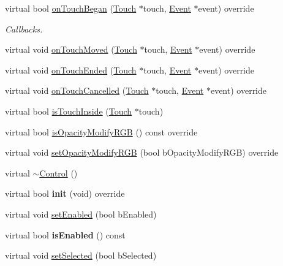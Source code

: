 \begin{DoxyCompactItemize}
\item 
virtual bool \hyperlink{classControl_a0cf2e20cea5b57b263e965be4a19ab52}{on\+Touch\+Began} (\hyperlink{classTouch}{Touch} $\ast$touch, \hyperlink{classEvent}{Event} $\ast$event) override
\begin{DoxyCompactList}\small\item\em Callbacks. \end{DoxyCompactList}\item 
virtual void \hyperlink{classControl_a26d2e6af053319dc605949678f726622}{on\+Touch\+Moved} (\hyperlink{classTouch}{Touch} $\ast$touch, \hyperlink{classEvent}{Event} $\ast$event) override
\item 
virtual void \hyperlink{classControl_a56073e57060169fe80cbb6ce1f4abe28}{on\+Touch\+Ended} (\hyperlink{classTouch}{Touch} $\ast$touch, \hyperlink{classEvent}{Event} $\ast$event) override
\item 
virtual void \hyperlink{classControl_a573efad6a6b492f4a6f4c5d06f0cdb88}{on\+Touch\+Cancelled} (\hyperlink{classTouch}{Touch} $\ast$touch, \hyperlink{classEvent}{Event} $\ast$event) override
\item 
virtual bool \hyperlink{classControl_a897865e3e4ff50ed827f33966e786c7f}{is\+Touch\+Inside} (\hyperlink{classTouch}{Touch} $\ast$touch)
\item 
virtual bool \hyperlink{classControl_af7a191cace0c56d1dae182716c0e8150}{is\+Opacity\+Modify\+R\+GB} () const override
\item 
virtual void \hyperlink{classControl_ad2bebed567807e1e309513666f67ad5e}{set\+Opacity\+Modify\+R\+GB} (bool b\+Opacity\+Modify\+R\+GB) override
\item 
virtual \hyperlink{classControl_aedda1328c4f8b8d49bca8f0812d3bfd1}{$\sim$\+Control} ()
\item 
\mbox{\label{classControl_a9c737d37757931b7d397b3e4e005f4f1}} 
virtual bool {\bfseries init} (void) override
\item 
virtual void \hyperlink{classControl_acf90798c4ddf200abae8b909c029c7ab}{set\+Enabled} (bool b\+Enabled)
\item 
\mbox{\label{classControl_a42eedcd952b8fa860e98054ae72981be}} 
virtual bool {\bfseries is\+Enabled} () const
\item 
virtual void \hyperlink{classControl_a05f31c82f5ba3bb758d320f59c404555}{set\+Selected} (bool b\+Selected)
\item 
\mbox{\label{classControl_a481f8fa4063c42a615cedc1f9356d9f5}} 

\end{DoxyCompactItemize}
